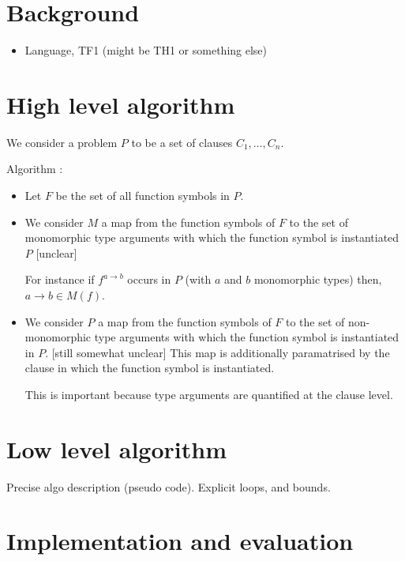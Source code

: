 \documentclass{article}
\begin{document}
\section{Background}

\begin{itemize}
    \item Language, TF1 (might be TH1 or something else)
\end{itemize}

\section{High level algorithm}

We consider a problem \(P\) to be a set of clauses \(C_1, \dots, C_n\).

Algorithm :
\begin{itemize}
    \item Let \(F\) be the set of all function symbols in \(P\).
    \item We consider \(M\) a map from the function symbols of \(F\) to the set of monomorphic type arguments with which the function symbol is instantiated \(P\) [unclear]

    For instance if \(f^{a \rightarrow b}\) occurs in \(P\) (with \(a\) and \(b\) monomorphic types) then, \(a \rightarrow b \in M(f) \).
    \item We consider \(P\) a map from the function symbols of \(F\) to the set of non-monomorphic type arguments with which the function symbol is instantiated in \(P\). [still somewhat unclear] This map is additionally paramatrised by the clause in which the function symbol is instantiated.

    This is important because type arguments are quantified at the clause level. 
\end{itemize}

\section{Low level algorithm}

Precise algo description (pseudo code). Explicit loops, and bounds.

\section{Implementation and evaluation}
\end{document}
